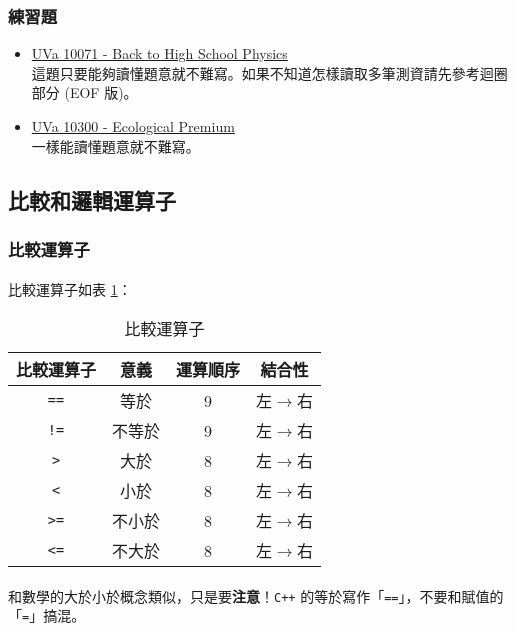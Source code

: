 \documentclass[12pt,a4paper,oneside]{article}
\begin{document}
\begin{CJK}{UTF8}{bkai}
\subsubsection*{練習題}
\begin{itemize}
\item \label{basic:cpp:problem:uva:10071}\href{http://pcshic.github.io/uniDog/problem/p10071/}{UVa 10071 - Back to High School Physics}\\這題只要能夠讀懂題意就不難寫。如果不知道怎樣讀取多筆測資請先參考迴圈部分 (EOF 版)。
\item \label{basic:cpp:problem:uva:10300}\href{http://pcshic.github.io/uniDog/problem/p10300/}{UVa 10300 - Ecological Premium}\\一樣能讀懂題意就不難寫。
\end{itemize}

\subsection{比較和邏輯運算子}
\subsubsection{比較運算子}

\paragraph{}比較運算子如表 \ref{basic:cpp:table:operator:comparison}：
\begin{table}[h!]
\centering
\begin{tabular}{|c|c|c|c|}
\hline
比較運算子 & 意義 & 運算順序 & 結合性\\
\hline
\hline
\lstinline!==! & 等於 & 9 & 左$\rightarrow$右\\
\hline
\lstinline"!=" & 不等於 & 9 & 左$\rightarrow$右\\
\hline
\lstinline!>!  & 大於 & 8 & 左$\rightarrow$右\\
\hline
\lstinline!<!  & 小於 & 8 & 左$\rightarrow$右\\
\hline
\lstinline!>=! & 不小於 & 8 & 左$\rightarrow$右\\
\hline
\lstinline!<=! & 不大於 & 8 & 左$\rightarrow$右\\
\hline
\end{tabular}
\caption{比較運算子}
\label{basic:cpp:table:operator:comparison}
\end{table}

\paragraph{}和數學的大於小於概念類似，只是要\textbf{注意}！\texttt{C++} 的等於寫作「\lstinline!==!」，不要和賦值的「\lstinline!=!」搞混。

\end{CJK}
\end{document}
